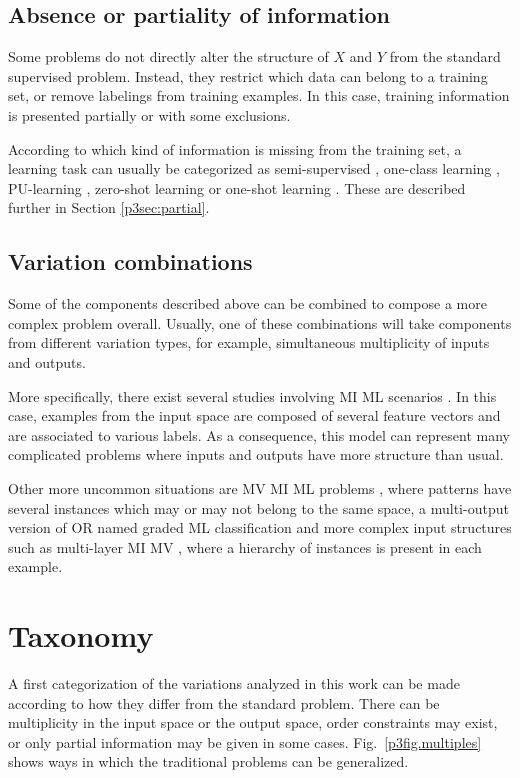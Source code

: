 \subsection{Absence or partiality of information}

Some problems do not directly alter the structure of $X$ and $Y$ from the standard supervised problem. Instead, they restrict which data can belong to a training set, or remove labelings from training examples. In this case, training information is presented partially or with some exclusions.

According to which kind of information is missing from the training set, a learning task  can usually be categorized as semi-supervised , one-class learning , PU-learning , zero-shot learning  or one-shot learning . These are described further in Section \ref{p3sec:partial}.

\subsection{Variation combinations}

Some of the components described above can be combined to compose a more complex problem overall. Usually, one of these combinations will take components from different variation types, for example, simultaneous multiplicity of inputs and outputs. 

More specifically, there exist several studies involving MI ML scenarios . In this case, examples from the input space are composed of several feature vectors and are associated to various labels. As a consequence, this model can represent many complicated problems where inputs and outputs have more structure than usual.

Other more uncommon situations are MV MI ML problems , where patterns have several instances which may or may not belong to the same space, a multi-output version of OR named graded ML classification  and more complex input structures such as multi-layer MI MV , where a hierarchy of instances is present in each example. 

\section{Taxonomy}
\label{p3sec:taxonomy}

A first categorization of the variations analyzed in this work can be made according to how they differ from the standard problem. There can be multiplicity in the input space or the output space, order constraints may exist, or only partial information may be given in some cases. Fig.~\ref{p3fig.multiples} shows ways in which the traditional problems can be generalized. 

